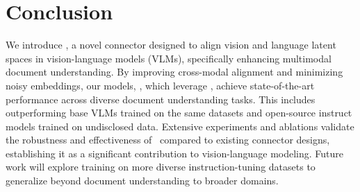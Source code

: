 \section{Conclusion}
We introduce \alignmodule, a novel connector designed to align vision and language latent spaces in vision-language models (VLMs), specifically enhancing multimodal document understanding. By improving cross-modal alignment and minimizing noisy embeddings, our models, \ourmodel, which leverage \alignmodule, achieve state-of-the-art performance across diverse document understanding tasks. This includes outperforming base VLMs trained on the same datasets and open-source instruct models trained on undisclosed data. Extensive experiments and ablations validate the robustness and effectiveness of \alignmodule \ compared to existing connector designs, establishing it as a significant contribution to vision-language modeling. Future work will explore training on more diverse instruction-tuning datasets to generalize beyond document understanding to broader domains.
